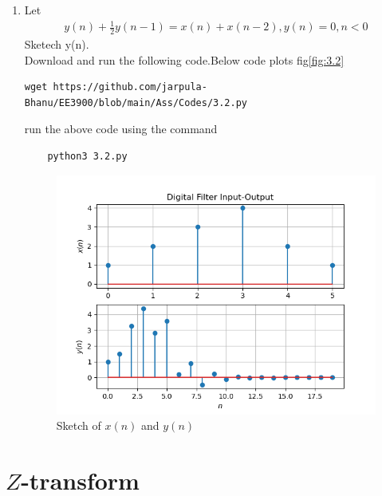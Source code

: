 \documentclass[journal,12pt,twocolumn]{IEEEtran}
\renewcommand\thesection{\arabic{section}}
\begin{document}
\begin{enumerate}[label=\thesection.\arabic*
,ref=\thesection.\theenumi]
\item Let
	\begin{align}\label{3.2}
		y(n) + \frac{1}{2}y(n-1) = x(n)+x(n-2),
		y(n)=0,n<0
	\end{align}
Sketech y(n).\\
\solution Download and run the following code.Below code plots fig\eqref{fig:3.2}
\begin{lstlisting}
wget https://github.com/jarpula-Bhanu/EE3900/blob/main/Ass/Codes/3.2.py
\end{lstlisting}
run the above code using the command
\begin{lstlisting}
	python3 3.2.py
\end{lstlisting}
\begin{figure}[h]
    \centering
    \includegraphics[width=\columnwidth]{./figs/3.2.png}
    \caption{Sketch of $x(n)$ and $y(n)$}
    \label{fig:3.2}
\end{figure}

\end{enumerate}

\section{$Z$-transform}
\end{document}
